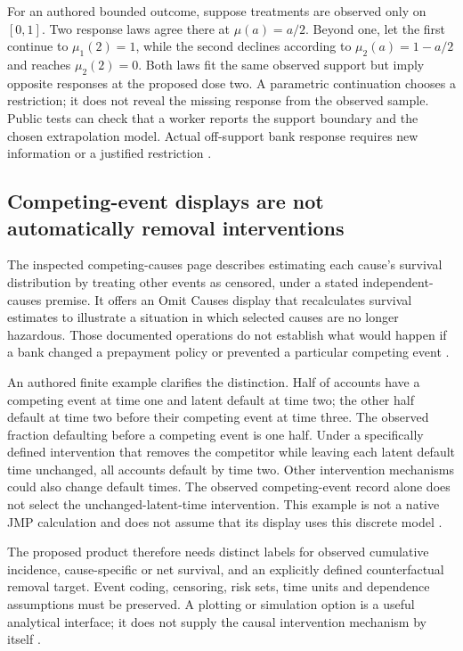 For an authored bounded outcome, suppose treatments are observed only on
$[0,1]$. Two response laws agree there at $\mu(a)=a/2$. Beyond one, let
the first continue to $\mu_1(2)=1$, while the second declines according to
$\mu_2(a)=1-a/2$ and reaches $\mu_2(2)=0$. Both laws fit the same
observed support but imply opposite responses at the proposed dose two.
A parametric continuation chooses a restriction; it does not reveal the
missing response from the observed sample. Public tests can check that a
worker reports the support boundary and the chosen extrapolation model.
Actual off-support bank response requires new information or a justified
restriction \cite{exec24_jmp_choice}.

\subsection{Competing-event displays are not automatically removal interventions}
The inspected competing-causes page describes estimating each cause's
survival distribution by treating other events as censored, under a stated
independent-causes premise. It offers an Omit Causes display that
recalculates survival estimates to illustrate a situation in which selected
causes are no longer hazardous. Those documented operations do not establish
what would happen if a bank changed a prepayment policy or prevented a
particular competing event
\cite{exec14_survival_jmp}.

An authored finite example clarifies the distinction. Half of accounts
have a competing event at time one and latent default at time two; the
other half default at time two before their competing event at time three.
The observed fraction defaulting before a competing event is one half.
Under a specifically defined intervention that removes the competitor
while leaving each latent default time unchanged, all accounts default
by time two. Other intervention mechanisms could also change default
times. The observed competing-event record alone does not select the
unchanged-latent-time intervention. This example is not a native JMP
calculation and does not assume that its display uses this discrete model
\cite{exec24_jmp_choice}.

The proposed product therefore needs distinct labels for observed
cumulative incidence, cause-specific or net survival, and an explicitly
defined counterfactual removal target. Event coding, censoring, risk sets,
time units and dependence assumptions must be preserved. A plotting or
simulation option is a useful analytical interface; it does not supply the
causal intervention mechanism by itself
\cite{exec14_survival_jmp,exec24_jmp_choice}.


